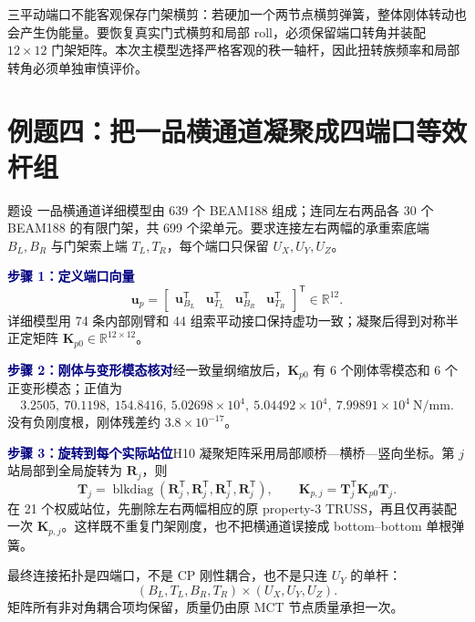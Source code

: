 \documentclass[11pt,a4paper]{article}
\newcommand{\T}{\mathsf{T}}
\newcommand{\Step}[1]{\par\medskip\noindent\textcolor{Navy}{\bfseries 步骤 #1}\quad}
\begin{document}
\begin{warningbox}[普通门架的扭转边界]
三平动端口不能客观保存门架横剪：若硬加一个两节点横剪弹簧，整体刚体转动也会产生伪能量。要恢复真实门式横剪和局部 roll，必须保留端口转角并装配 $12\times12$ 门架矩阵。本次主模型选择严格客观的秩一轴杆，因此扭转族频率和局部转角必须单独审慎评价。
\end{warningbox}

\section{例题四：把一品横通道凝聚成四端口等效杆组}
\begin{problem}{题设}
一品横通道详细模型由 639 个 BEAM188 组成；连同左右两品各 30 个 BEAM188 的有限门架，共 699 个梁单元。要求连接左右两幅的承重索底端 $B_L,B_R$ 与门架索上端 $T_L,T_R$，每个端口只保留 $U_X,U_Y,U_Z$。
\end{problem}

\Step{1：定义端口向量}
\begin{equation}
\bm u_p=
\begin{bmatrix}
\bm u_{B_L}^{\T}&\bm u_{T_L}^{\T}&\bm u_{B_R}^{\T}&\bm u_{T_R}^{\T}
\end{bmatrix}^{\T}\in\mathbb R^{12}.
\end{equation}
详细模型用 74 条内部刚臂和 44 组索平动接口保持虚功一致；凝聚后得到对称半正定矩阵 $\bm K_{p0}\in\mathbb R^{12\times12}$。

\Step{2：刚体与变形模态核对}经一致量纲缩放后，$\bm K_{p0}$ 有 6 个刚体零模态和 6 个正变形模态；正值为
\begin{equation}
3.2505,\ 70.1198,\ 154.8416,\ 5.02698\!\times10^4,\
5.04492\!\times10^4,\ 7.99891\!\times10^4\ \mathrm{N/mm}.
\end{equation}
没有负刚度根，刚体残差约 $3.8\times10^{-17}$。

\Step{3：旋转到每个实际站位}H10 凝聚矩阵采用局部顺桥—横桥—竖向坐标。第 $j$ 站局部到全局旋转为 $\bm R_j$，则
\begin{equation}
\bm T_j=\operatorname{blkdiag}(\bm R_j^{\T},\bm R_j^{\T},\bm R_j^{\T},\bm R_j^{\T}),
\qquad
\boxed{\bm K_{p,j}=\bm T_j^{\T}\bm K_{p0}\bm T_j}.
\end{equation}
在 21 个权威站位，先删除左右两幅相应的原 property-3 TRUSS，再且仅再装配一次 $\bm K_{p,j}$。这样既不重复门架刚度，也不把横通道误接成 bottom--bottom 单根弹簧。

\begin{answerbox}[本题答案]
最终连接拓扑是四端口，不是 CP 刚性耦合，也不是只连 $U_Y$ 的单杆：
\[
(B_L,T_L,B_R,T_R)\times(U_X,U_Y,U_Z).
\]
矩阵所有非对角耦合项均保留，质量仍由原 MCT 节点质量承担一次。
\end{answerbox}
\end{document}
